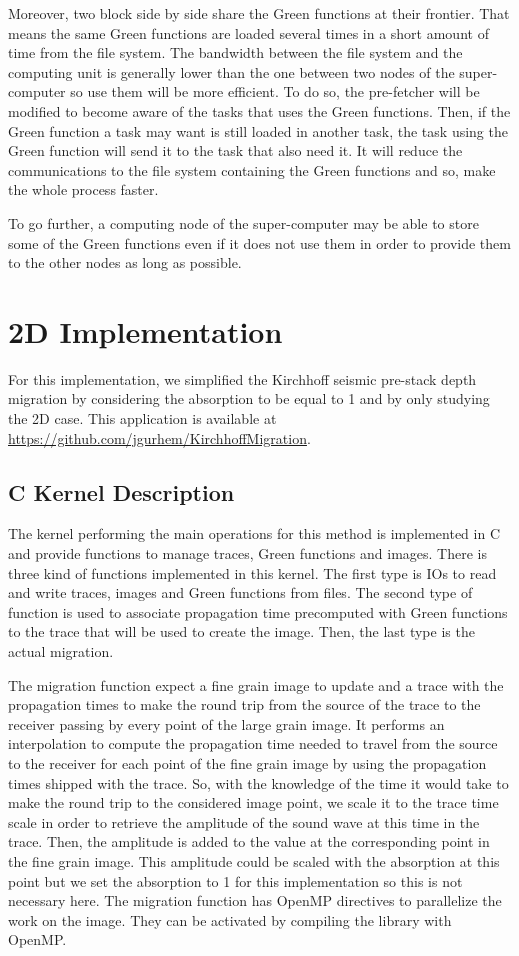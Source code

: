 Moreover, two block side by side share the Green functions at their frontier.
That means the same Green functions are loaded several times in a short amount of time from the file system.
The bandwidth between the file system and the computing unit is generally lower than the one between two nodes of the super-computer so use them will be more efficient.
To do so, the pre-fetcher will be modified to become aware of the tasks that uses the Green functions.
Then, if the Green function a task may want is still loaded in another task, the task using the Green function will send it to the task that also need it.
It will reduce the communications to the file system containing the Green functions and so, make the whole process faster.

To go further, a computing node of the super-computer may be able to store some of the Green functions even if it does not use them in order to provide them to the other nodes as long as possible.

\section{2D Implementation}

For this implementation, we simplified the Kirchhoff seismic pre-stack depth migration by considering the absorption to be equal to 1 and by only studying the 2D case.
This application is available at \url{https://github.com/jgurhem/KirchhoffMigration}.

\subsection{C Kernel Description}
The kernel performing the main operations for this method is implemented in C and provide functions to manage traces, Green functions and images.
There is three kind of functions implemented in this kernel.
The first type is IOs to read and write traces, images and Green functions from files.
The second type of function is used to associate propagation time precomputed with Green functions to the trace that will be used to create the image.
Then, the last type is the actual migration.

The migration function expect a fine grain image to update and a trace with the propagation times to make the round trip from the source of the trace to the receiver passing by every point of the large grain image.
It performs an interpolation to compute the propagation time needed to travel from the source to the receiver for each point of the fine grain image by using the propagation times shipped with the trace.
So, with the knowledge of the time it would take to make the round trip to the considered image point, we scale it to the trace time scale in order to retrieve the amplitude of the sound wave at this time in the trace.
Then, the amplitude is added to the value at the corresponding point in the fine grain image.
This amplitude could be scaled with the absorption at this point but we set the absorption to 1 for this implementation so this is not necessary here.
The migration function has OpenMP directives to parallelize the work on the image.
They can be activated by compiling the library with OpenMP.

